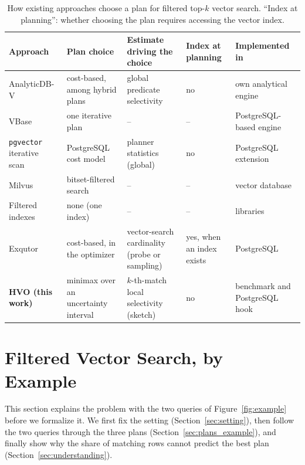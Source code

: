 \documentclass[sigconf,nonacm]{acmart}
\begin{document}
\begin{table}[!t]
\footnotesize
\centering
\caption{How existing approaches choose a plan for filtered top-$k$ vector search. ``Index at planning'': whether choosing the plan requires accessing the vector index.}
\label{tab:related}
\setlength{\tabcolsep}{4pt}
\begin{tabular}{p{}p{}p{}p{}p{}}
\toprule
Approach & Plan choice & Estimate driving the choice & Index at planning & Implemented in \\
\midrule
AnalyticDB-V~\cite{wei2020analyticdbv} & cost-based, among hybrid plans & global predicate selectivity & no & own analytical engine \\
VBase~\cite{zhang2023vbase} & one iterative plan & -- & -- & PostgreSQL-based engine \\
\texttt{pgvector} iterative scan~\cite{pgvector2024} & PostgreSQL cost model & planner statistics (global) & no & PostgreSQL extension \\
Milvus~\cite{wang2021milvus} & bitset-filtered search & -- & -- & vector database \\
Filtered indexes~\cite{gollapudi2023filtereddiskann,wang2022nhq,zuo2024serf,patel2024acorn} & none (one index) & -- & -- & libraries \\
Exqutor~\cite{exqutor2026} & cost-based, in the optimizer & vector-search cardinality (probe or sampling) & yes, when an index exists & PostgreSQL \\
\textbf{HVO (this work)} & minimax over an uncertainty interval & $k$-th-match local selectivity (sketch) & no & benchmark and PostgreSQL hook \\
\bottomrule
\end{tabular}
\end{table}

\section{Filtered Vector Search, by Example}\label{sec:example}
This section explains the problem with the two queries of Figure~\ref{fig:example} before we formalize it. We first fix the setting (Section~\ref{sec:setting}), then follow the two queries through the three plans (Section~\ref{sec:plans_example}), and finally show why the share of matching rows cannot predict the best plan (Section~\ref{sec:understanding}).
\end{document}
